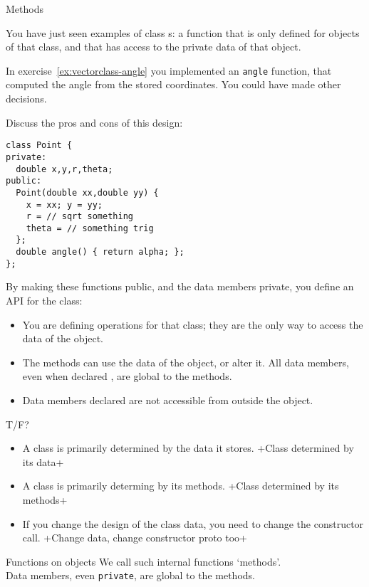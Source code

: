  {Methods}

You have just seen examples of class
s: a function that is only defined for objects of
that class, and that has access to the private data of that object.

In exercise~\ref{ex:vectorclass-angle} you implemented an \lstinline{angle} function,
that computed the angle from the stored coordinates.
You could have made other decisions.

\begin{exercise}
  \label{ex:vectorclass-redundant}
  Discuss the pros and cons of this design:
\begin{lstlisting}
class Point {
private:
  double x,y,r,theta;
public:
  Point(double xx,double yy) {
    x = xx; y = yy;
    r = // sqrt something
    theta = // something trig
  };
  double angle() { return alpha; };
};
\end{lstlisting}
\end{exercise}

By making these functions public, and the data members
private, you define an \acf{API} for the class:
\begin{itemize}
\item You are defining operations for that class; they are the only
  way to access the data of the object.
\item The methods can use the data of the object, or alter it. All
  data members, even when declared , are global to the methods.
\item  Data members declared  are not accessible from outside the
  object.
\end{itemize}

\begin{review}
  \label{rev:class-meth-data}
  T/F?
  \begin{itemize}
  \item A class is primarily determined by the data it stores.
    \slackpollTF+Class determined by its data+
  \item A class is primarily determing by its methods.
    \slackpollTF+Class determined by its methods+
  \item If you change the design of the class data,
    you need to change the constructor call.
    \slackpollTF+Change data, change constructor proto too+
  \end{itemize}
\end{review}

\begin{slide}{Functions on objects}
  \label{sl:obj-func}
  We call such internal functions `methods'.\\
  Data members, even \lstinline{private}, are global to the methods.
\end{slide}


